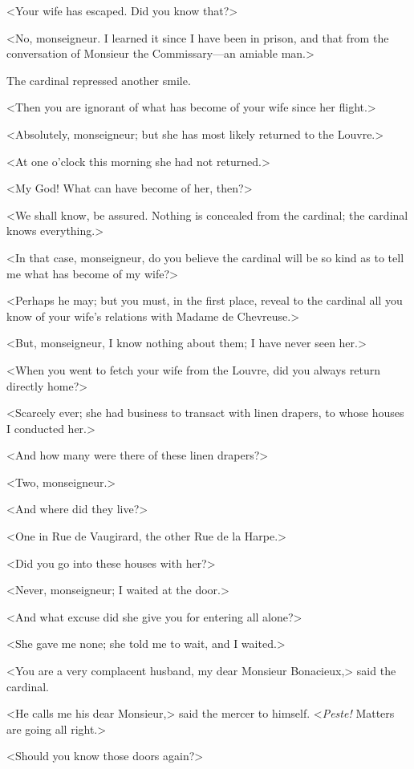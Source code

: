 <Your wife has escaped. Did you know that?> 

<No, monseigneur. I learned it since I have been in prison, and that from the conversation of Monsieur the Commissary---an amiable man.> 

The cardinal repressed another smile. 

<Then you are ignorant of what has become of your wife since her flight.> 

<Absolutely, monseigneur; but she has most likely returned to the Louvre.> 

<At one o'clock this morning she had not returned.> 

<My God! What can have become of her, then?> 

<We shall know, be assured. Nothing is concealed from the cardinal; the cardinal knows everything.> 

<In that case, monseigneur, do you believe the cardinal will be so kind as to tell me what has become of my wife?> 

<Perhaps he may; but you must, in the first place, reveal to the cardinal all you know of your wife's relations with Madame de Chevreuse.> 

<But, monseigneur, I know nothing about them; I have never seen her.> 

<When you went to fetch your wife from the Louvre, did you always return directly home?> 

<Scarcely ever; she had business to transact with linen drapers, to whose houses I conducted her.> 

<And how many were there of these linen drapers?> 

<Two, monseigneur.> 

<And where did they live?> 

<One in Rue de Vaugirard, the other Rue de la Harpe.> 

<Did you go into these houses with her?> 

<Never, monseigneur; I waited at the door.> 

<And what excuse did she give you for entering all alone?> 

<She gave me none; she told me to wait, and I waited.> 

<You are a very complacent husband, my dear Monsieur Bonacieux,> said the cardinal. 

<He calls me his dear Monsieur,> said the mercer to himself. <\textit{Peste!} Matters are going all right.> 

<Should you know those doors again?> 

